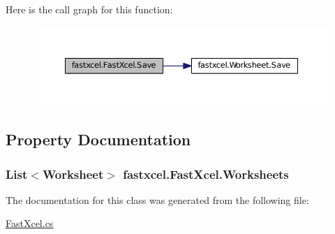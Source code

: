 Here is the call graph for this function:\nopagebreak
\begin{figure}[H]
\begin{center}
\leavevmode
\includegraphics[width=374pt]{classfastxcel_1_1_fast_xcel_a85ee99fe6b7f6a76f9ca2c4ca2181d22_cgraph}
\end{center}
\end{figure}




\subsection{Property Documentation}
\hypertarget{classfastxcel_1_1_fast_xcel_a70c27290ee92fe9812e845a2db8765d6}{
\subsubsection[{Worksheets}]{\setlength{\rightskip}{0pt plus 5cm}List$<${\bf Worksheet}$>$ fastxcel.FastXcel.Worksheets}}
\label{classfastxcel_1_1_fast_xcel_a70c27290ee92fe9812e845a2db8765d6}


The documentation for this class was generated from the following file:\begin{DoxyCompactItemize}
\item 
\hyperlink{_fast_xcel_8cs}{FastXcel.cs}\end{DoxyCompactItemize}
